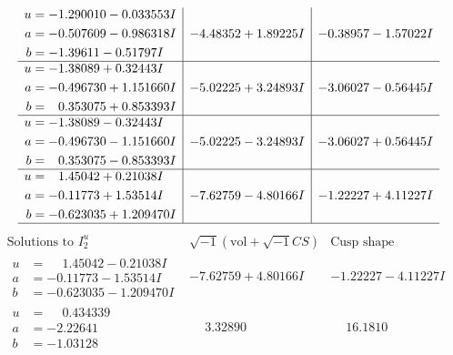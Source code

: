 \documentclass[1p]{elsarticle_modified}
\theoremstyle{definition}
\newcommand{\I}{\sqrt{-1}}
\begin{document}
$$\begin{array}{c|c|c}
\begin{aligned}
u &= -1.290010 - 0.033553 I \\
a &= -0.507609 - 0.986318 I \\
b &= -1.39611 - 0.51797 I\end{aligned}
 & -4.48352 + 1.89225 I & -0.38957 - 1.57022 I \\ \hline\begin{aligned}
u &= -1.38089 + 0.32443 I \\
a &= -0.496730 + 1.151660 I \\
b &= \phantom{-}0.353075 + 0.853393 I\end{aligned}
 & -5.02225 + 3.24893 I & -3.06027 - 0.56445 I \\ \hline\begin{aligned}
u &= -1.38089 - 0.32443 I \\
a &= -0.496730 - 1.151660 I \\
b &= \phantom{-}0.353075 - 0.853393 I\end{aligned}
 & -5.02225 - 3.24893 I & -3.06027 + 0.56445 I \\ \hline\begin{aligned}
u &= \phantom{-}1.45042 + 0.21038 I \\
a &= -0.11773 + 1.53514 I \\
b &= -0.623035 + 1.209470 I\end{aligned}
 & -7.62759 - 4.80166 I & -1.22227 + 4.11227 I\\
 \hline 
 \end{array}$$\newpage$$\begin{array}{c|c|c}  
\text{Solutions to }I^u_{2}& \I (\text{vol} + \sqrt{-1}CS) & \text{Cusp shape}\\
 \hline 
\begin{aligned}
u &= \phantom{-}1.45042 - 0.21038 I \\
a &= -0.11773 - 1.53514 I \\
b &= -0.623035 - 1.209470 I\end{aligned}
 & -7.62759 + 4.80166 I & -1.22227 - 4.11227 I \\ \hline\begin{aligned}
u &= \phantom{-}0.434339\phantom{ +0.000000I} \\
a &= -2.22641\phantom{ +0.000000I} \\
b &= -1.03128\phantom{ +0.000000I}\end{aligned}
 & \phantom{-}3.32890\phantom{ +0.000000I} & \phantom{-}16.1810\phantom{ +0.000000I} \\ \hline\begin{aligned}

\end{aligned}
\end{array}$$
\end{document}
